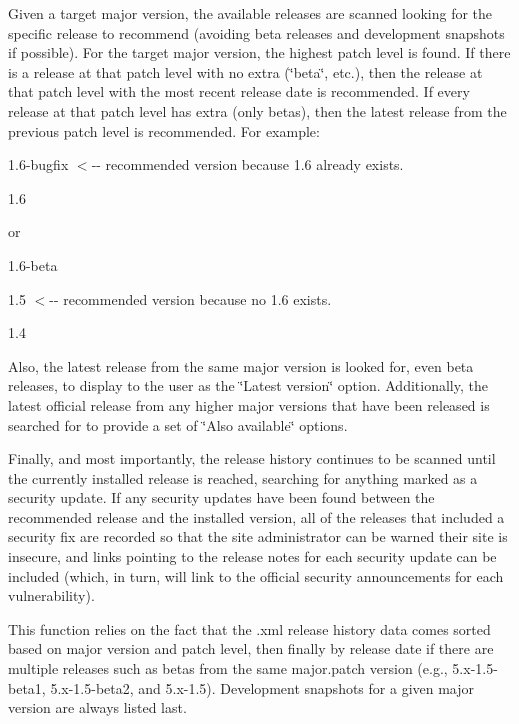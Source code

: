 Given a target major version, the available releases are scanned looking for the specific release to recommend (avoiding beta releases and development snapshots if possible). For the target major version, the highest patch level is found. If there is a release at that patch level with no extra (\char`\"{}beta\char`\"{}, etc.), then the release at that patch level with the most recent release date is recommended. If every release at that patch level has extra (only betas), then the latest release from the previous patch level is recommended. For example:


\begin{DoxyItemize}
\item 1.6-\/bugfix $<$-\/-\/ recommended version because 1.6 already exists.
\item 1.6
\end{DoxyItemize}

or


\begin{DoxyItemize}
\item 1.6-\/beta
\item 1.5 $<$-\/-\/ recommended version because no 1.6 exists.
\item 1.4
\end{DoxyItemize}

Also, the latest release from the same major version is looked for, even beta releases, to display to the user as the \char`\"{}Latest version\char`\"{} option. Additionally, the latest official release from any higher major versions that have been released is searched for to provide a set of \char`\"{}Also available\char`\"{} options.

Finally, and most importantly, the release history continues to be scanned until the currently installed release is reached, searching for anything marked as a security update. If any security updates have been found between the recommended release and the installed version, all of the releases that included a security fix are recorded so that the site administrator can be warned their site is insecure, and links pointing to the release notes for each security update can be included (which, in turn, will link to the official security announcements for each vulnerability).

This function relies on the fact that the .xml release history data comes sorted based on major version and patch level, then finally by release date if there are multiple releases such as betas from the same major.patch version (e.g., 5.x-\/1.5-\/beta1, 5.x-\/1.5-\/beta2, and 5.x-\/1.5). Development snapshots for a given major version are always listed last.


